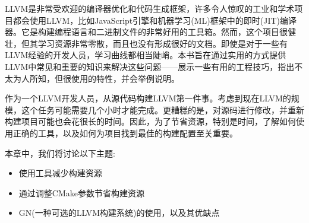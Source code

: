
LLVM是非常受欢迎的编译器优化和代码生成框架，许多令人惊叹的工业和学术项目都会使用LLVM，比如JavaScript引擎和机器学习(ML)框架中的即时(JIT)编译器。它是构建编程语言和二进制文件的非常好用的工具箱。然而，这个项目很健壮，但其学习资源非常零散，而且也没有形成很好的文档。即使是对于一些有LLVM经验的开发人员，学习曲线都相当陡峭。本书旨在通过实用的方式提供LLVM中常见和重要的知识来解决这些问题——展示一些有用的工程技巧，指出不太为人所知，但很使用的特性，并会举例说明。

作为一个LLVM开发人员，从源代码构建LLVM第一件事。考虑到现在LLVM的规模，这个任务可能需要几个小时才能完成。更糟糕的是，对源码进行修改，并重新构建项目可能也会花很长的时间。因此，为了节省资源，特别是时间，了解如何使用正确的工具，以及如何为项目找到最佳的构建配置至关重要。

本章中，我们将讨论以下主题:

\begin{itemize}
	\item 使用工具减少构建资源
	\item 通过调整CMake参数节省构建资源
	\item GN(一种可选的LLVM构建系统)的使用，以及其优缺点
\end{itemize}













